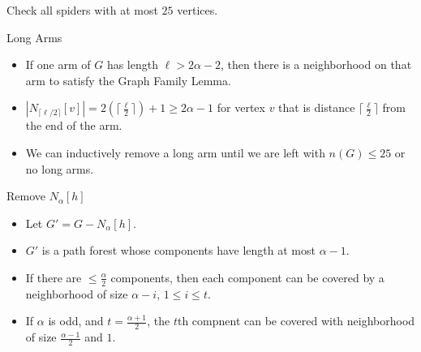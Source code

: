 \documentclass{beamer}
\begin{document}
\begin{frame}{Check all spiders with at most $25$ vertices.}
\begin{figure}
\begin{tiny}
    \end{tiny}
\end{figure}
\end{frame}

\begin{frame}{Long Arms}
\begin{itemize}
\item If one arm of $G$ has length $\ell > 2\alpha - 2$, then there is a neighborhood on that arm to satisfy the Graph Family Lemma.
\item $|N_{\lceil \ell \slash 2 \rceil}[v]| = 2(\lceil \frac{\ell}{2}\rceil) + 1 \geq 2\alpha - 1$ for vertex $v$ that is distance $\lceil \frac{\ell}{2} \rceil$ from the end of the arm.
\item We can inductively remove a long arm until we are left with $n(G) \leq 25$ or no long arms.
\end{itemize}
\end{frame}

\begin{frame}{Remove $N_\alpha[h]$}
\begin{itemize}
\item Let $G' = G - N_{\alpha}[h]$.
\item $G'$ is a path forest whose components have length at most $\alpha - 1$.
\item If there are $ \leq \frac{\alpha}{2}$ components, then each component can be covered by a neighborhood of size $\alpha - i$, $1 \leq i \leq t$.
\item If $\alpha$ is odd, and $t = \frac{\alpha + 1}{2}$, the $t$th compnent can be covered with neighborhood of size $\frac{\alpha - 1}{2}$ and $1$.
\end{itemize}
\end{frame}
\end{document}
